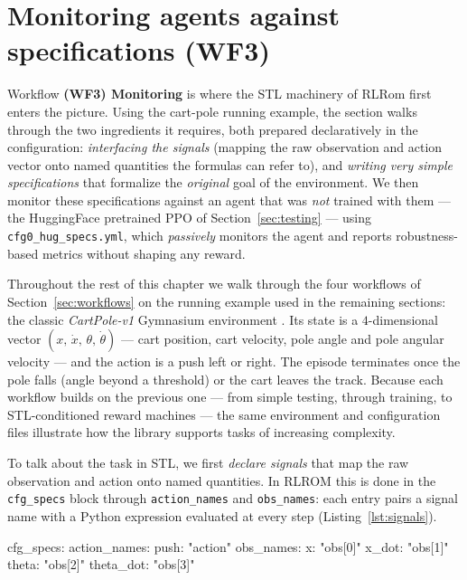 \section{Monitoring agents against specifications (WF3)}
\label{sec:specs}

Workflow \textbf{(WF3) Monitoring} is where the STL machinery of RLRom first
enters the picture. Using the cart-pole running example, the section walks
through the two ingredients it requires, both prepared declaratively in the
configuration: \emph{interfacing the signals} (mapping the raw observation and
action vector onto named quantities the formulas can refer to), and \emph{writing
very simple specifications} that formalize the \emph{original} goal of the
environment. We then monitor these specifications against an agent that was
\emph{not} trained with them --- the HuggingFace pretrained PPO of
Section~\ref{sec:testing} --- using \texttt{cfg0\_hug\_specs.yml}, which
\emph{passively} monitors the agent and reports robustness-based metrics without
shaping any reward.

Throughout the rest of this chapter we walk through the four workflows of
Section~\ref{sec:workflows} on the running example used in the remaining
sections: the classic \textit{CartPole-v1} Gymnasium environment \cite{gymnasium}.
Its state is a $4$-dimensional vector
$(x,\,\dot x,\,\theta,\,\dot\theta)$ --- cart position, cart velocity, pole angle
and pole angular velocity --- and the action is a push left or right. The episode
terminates once the pole falls (angle beyond a threshold) or the cart leaves the
track. Because each workflow builds on the previous one --- from simple testing,
through training, to STL-conditioned reward machines --- the same
environment and configuration files illustrate how the library supports tasks of
increasing complexity.

To talk about the task in STL, we first \emph{declare signals} that map the raw
observation and action onto named quantities. In \textsc{RLROM} this is done in the
\texttt{cfg\_specs} block through \texttt{action\_names} and \texttt{obs\_names}:
each entry pairs a signal name with a Python expression evaluated at every step
(Listing~\ref{lst:signals}).

\begin{cfglisting}[caption={Signal declarations from the CartPole observation.},label={lst:signals}]
cfg_specs:
  action_names:
    push: "action"
  obs_names:
    x:         "obs[0]"
    x_dot:     "obs[1]"
    theta:     "obs[2]"
    theta_dot: "obs[3]"
\end{cfglisting}

